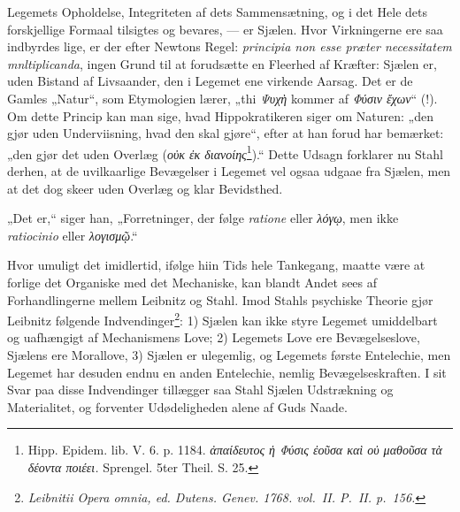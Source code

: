 \documentclass[12pt,a4paper]{book}
\begin{document}
Legemets Opholdelse, Integriteten af dets Sammensætning, og i det
Hele dets forskjellige Formaal tilsigtes og bevares, --- er Sjælen.
Hvor Virkningerne ere saa indbyrdes lige, er der efter Newtons Regel:
\textit{principia non esse præter necessitatem mnltiplicanda}, ingen
Grund til at forudsætte en Fleerhed af Kræfter: Sjælen er, uden
Bistand af Livsaander, den i Legemet ene virkende Aarsag. Det er de
Gamles „Natur“, som Etymologien lærer, „thi \textit{Ψυχὴ} kommer af
\textit{Φύσιν ἔχων}“ (!). Om dette Princip kan man sige, hvad
Hippokratikeren siger om Naturen: „den gjør uden Underviisning, hvad
den skal gjøre“, efter at han forud har bemærket: „den gjør det uden
Overlæg (\textit{οὐκ ἐκ διανοίης}\footnote{Hipp. Epidem. lib. V. 6.
p. 1184. \textit{ἀπαίδευτος ἡ Φύσις ἐοῦσα καὶ οὐ μαθοῦσα τὰ δέοντα
ποιέει.} Sprengel. 5ter Theil. S. 25.}).“ Dette Udsagn forklarer nu
Stahl derhen, at de uvilkaarlige Bevægelser i Legemet vel ogsaa
udgaae fra Sjælen,
men at det dog skeer uden Overlæg og klar Bevidsthed.

\setcounter{footnote}{0}
„Det er,“ siger han, „Forretninger, der følge \textit{ratione} eller
\textit{λόγῳ}, men ikke \textit{ratiocinio} eller
\textit{λογισμῷ}.“

Hvor umuligt det imidlertid, ifølge hiin Tids hele Tankegang, maatte
være at forlige det Organiske med det Mechaniske, kan blandt Andet
sees af Forhandlingerne mellem Leibnitz og Stahl. Imod Stahls
psychiske Theorie gjør Leibnitz følgende
Indvendinger\footnote{\textit{Leibnitii Opera omnia, ed. Dutens.
Genev. 1768. vol.\ II. P.\ II. p.\ 156.}}: 1) Sjælen kan ikke styre
Legemet umiddelbart og uafhængigt af Mechanismens Love; 2) Legemets
Love ere Bevægelseslove, Sjælens ere Morallove, 3) Sjælen er
ulegemlig, og Legemets første Entelechie, men Legemet har desuden
endnu en anden Entelechie, nemlig Bevægelseskraften. I sit Svar paa
disse Indvendinger tillægger saa Stahl Sjælen Udstrækning og
Materialitet, og forventer Udødeligheden alene af Guds Naade.
\end{document}
